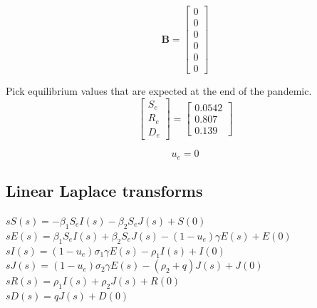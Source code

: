 \documentclass[fleqn]{article}
\begin{document}
\begin{equation*}
    \bm{B} = \begin{bmatrix}
        0 \\
        0 \\
        0 \\
        0 \\
        0 \\
        0
    \end{bmatrix}
\end{equation*}

Pick equilibrium values that are expected at the end of the pandemic.
\begin{equation*}
    \begin{bmatrix}
        S_e \\
        R_e \\
        D_e
    \end{bmatrix} = \begin{bmatrix}
        0.0542 \\
        0.807 \\
        0.139
    \end{bmatrix}
\end{equation*}

\begin{equation*}
    u_e = 0
\end{equation*}

\subsection*{Linear Laplace transforms}
\noindent
$sS(s) = -\beta_1 S_e I(s) - \beta_2 S_e J(s) + S(0)$ \\
$sE(s) = \beta_1 S_e I(s) + \beta_2 S_e J(s) - (1-u_e) \gamma E(s) + E(0)$ \\
$sI(s) = (1-u_e) \sigma_1 \gamma E(s) - \rho_1 I(s) + I(0)$ \\
$sJ(s) = (1-u_e) \sigma_2 \gamma E(s) - (\rho_2 + q) J(s) + J(0)$ \\
$sR(s) = \rho_1 I(s) + \rho_2 J(s) + R(0)$ \\
$sD(s) = qJ(s) + D(0)$ \\

\newpage
\end{document}
